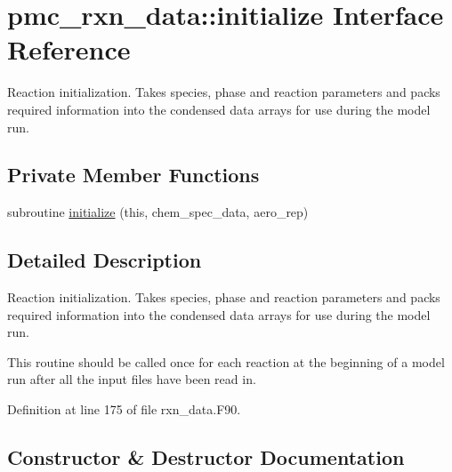\hypertarget{interfacepmc__rxn__data_1_1initialize}{}\section{pmc\+\_\+rxn\+\_\+data\+:\+:initialize Interface Reference}
\label{interfacepmc__rxn__data_1_1initialize}


Reaction initialization. Takes species, phase and reaction parameters and packs required information into the condensed data arrays for use during the model run.  


\subsection*{Private Member Functions}
\begin{DoxyCompactItemize}
\item 
subroutine \mbox{\hyperlink{interfacepmc__rxn__data_1_1initialize_ae2b84270dda3f4f1577f7ba07c81f493}{initialize}} (this, chem\+\_\+spec\+\_\+data, aero\+\_\+rep)
\end{DoxyCompactItemize}


\subsection{Detailed Description}
Reaction initialization. Takes species, phase and reaction parameters and packs required information into the condensed data arrays for use during the model run. 

This routine should be called once for each reaction at the beginning of a model run after all the input files have been read in. 

Definition at line 175 of file rxn\+\_\+data.\+F90.



\subsection{Constructor \& Destructor Documentation}
\mbox{\label{interfacepmc__rxn__data_1_1initialize_ae2b84270dda3f4f1577f7ba07c81f493}} 
